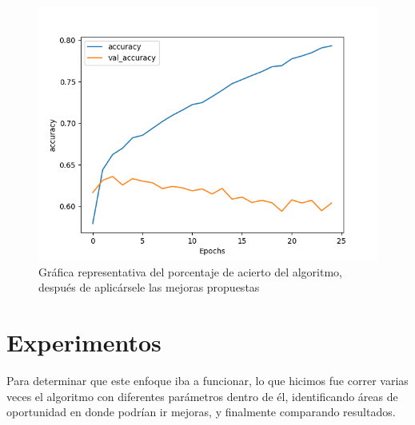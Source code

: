 \documentclass[a4]{sciposter}
\begin{document}
\begin{multicols}{3}
\begin{figure}
	\centering
	\captionsetup{type=figure}
	\setcounter{figure}{1}
	\includegraphics[scale=1.3]{img/Accuracy 2021-07.png}
	\caption{Gráfica representativa del porcentaje de acierto del algoritmo, después de aplicársele las mejoras propuestas}	
\end{figure}

\section{Experimentos}

Para determinar que este enfoque iba a funcionar, lo que hicimos fue correr varias veces el algoritmo con diferentes parámetros dentro de él, identificando áreas de oportunidad en donde podrían ir mejoras, y finalmente comparando resultados.



\begin{figure}[!tbp]
\captionsetup{type=figure}


\end{figure}
\end{multicols}
\end{document}
